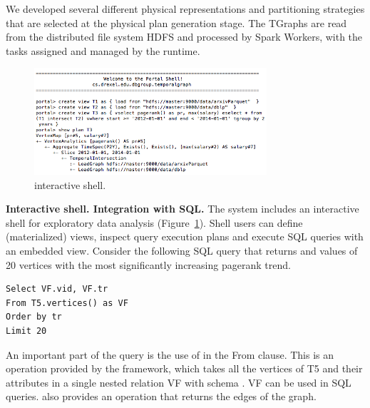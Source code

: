 
We developed several different physical representations and
partitioning strategies that are selected at the physical plan
generation stage. The TGraphs are read from the distributed file
system HDFS and processed by Spark Workers, with the tasks assigned
and managed by the runtime.

\begin{figure}[t]
\centering
\includegraphics[width=3.4in]{figs/shell.png}
\caption{\sys interactive shell.}
\label{fig:shell}
\end{figure}

{\bf Interactive shell. Integration with SQL.}  The \sys system
includes an interactive shell for exploratory data analysis
(Figure~\ref{fig:shell}). Shell users can define (materialized) views,
inspect query execution plans and execute SQL queries with an embedded
\sys view. Consider the following SQL query that returns 
and  values of 20 vertices with the most significantly
increasing pagerank trend.

\begin{small}
\begin{verbatim}
Select VF.vid, VF.tr
From T5.vertices() as VF
Order by tr
Limit 20
\end{verbatim}
\end{small}

An important part of the query is the use of  in
the From clause. This is an operation provided by the \sys
framework, which takes all the vertices of T5 and their attributes in
a single nested relation VF with schema . VF can be used in SQL queries. \sys also
provides an operation  that returns the edges of the
graph.



